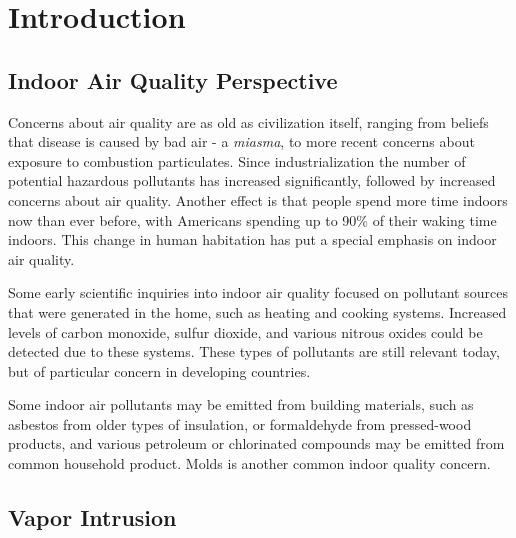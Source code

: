 \documentclass[../thesis.tex]{subfiles}
\begin{document}
\chapter{Introduction}


\section{Indoor Air Quality Perspective}

Concerns about air quality are as old as civilization itself, ranging from beliefs that disease is caused by bad air - a \textit{miasma}, to more recent concerns about exposure to combustion particulates.
Since industrialization the number of potential hazardous pollutants has increased significantly, followed by increased concerns about air quality.
Another effect is that people spend more time indoors now than ever before, with Americans spending up to 90\% of their waking time indoors\cite{klepeis_national_2001}.
This change in human habitation has put a special emphasis on indoor air quality.\par

Some early scientific inquiries into indoor air quality focused on pollutant sources that were generated in the home, such as heating and cooking systems.
Increased levels of carbon monoxide, sulfur dioxide, and various nitrous oxides could be detected due to these systems\cite{craig_d._hollowell_combustion-generated_1976}.
These types of pollutants are still relevant today, but of particular concern in developing countries\cite{world_health_organisation_who_2014}.\par

Some indoor air pollutants may be emitted from building materials, such as asbestos from older types of insulation, or formaldehyde from pressed-wood products, and various petroleum or chlorinated compounds may be emitted from common household product. %
Molds is another common indoor quality concern\cite{world_health_organisation_who_2009}.

\section{Vapor Intrusion}
\end{document}
